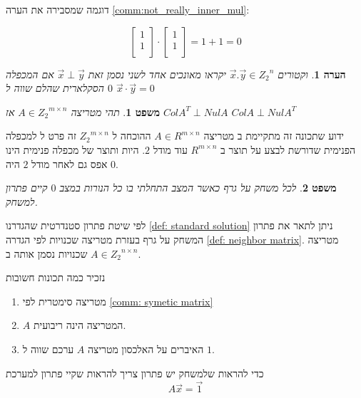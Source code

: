 \documentclass[12pt,twoside]{article}
\newtheorem{theorem}{משפט}[section]
\newtheorem{comm}{הערה}[section]
\newcommand{\Zn}{{Z_2}^n}
\begin{document}
דוגמה 
שמסבירה את הערה
\ref{comm:not_really_inner_mul}:

\[
    \begin{bmatrix}
    1 \\
    1 \\
    \end{bmatrix}    
    \cdot 
    \begin{bmatrix}
    1 \\
    1 \\
    \end{bmatrix} 
    = 1 + 1 = 0
\]

\begin{comm}
    וקטורים 
    $\vec{x}. \vec{y} \in \Zn $
    יקראו מאונכים אחד לשני נסמן זאת 
    $\vec{x} \perp  \vec{y}$
    אם המכפלה הסקלארית שהלם שווה 
    ל
    $0$
    $\vec{x} \cdot \vec{y} = 0$
\end{comm}

\begin{theorem}
    \label{the: Nul A and Col AT}
    תהי מטריצה 
    $A \in {Z_2}^{m \times n }$
    אז 
    $ColA^T \perp Nul A$
    $ColA \perp Nul A^T$
\end{theorem}

ידוע שתכונה זה מתקיימת 
ב
מטריצה 
$A \in R^{m \times n}$
ההוכחה 
ל
$ {Z_2}^{m \times n}$
זה
פרט ל
למכפלה הפנימית 
שדורשת 
לבצע על תוצר 
ב
$R^{m \times n}$
עוד 
מודל 
$2$.
היות ותוצר של מכפלה פנימית הינו אפס גם לאחר מודל 
$2$
היה 
$0$.

\begin{theorem}
    \label{thrm: clean game has solution}
    לכל משחק על גרף כאשר המצב התחלתי בו כל הנורות במצב 
    $0$
    קיים פתרון למשחק.
\end{theorem}
לפי 
שיטת פתרון סטנדרטית 
שהגדרנו
\ref{def: standard solution}
ניתן לתאר את פתרון המשחק על גרף בעזרת מטריצה
שכנויות לפי הגדרה 
\ref{def: neighbor matrix}.
מטריצה שכנויות
נסמן אותה ב
$A \in {Z_2}^{n \times n}$.

נזכיר כמה תכונות חשובות
\begin{enumerate}
    \item 
    מטריצה סימטרית לפי
    \ref{comm: symetic matrix}
    \item 
    $A$
    המטריצה הינה ריבועית.
    \item 
    האיברים על האלכסון
    מטריצה 
    $A$
    ערכם שווה ל
    $1$.
\end{enumerate}

כדי להראות שלמשחק יש פתרון 
צריך להראות שקיי פתרון למערכת
\[A \vec{x} = \vec{1} \]
\end{document}
